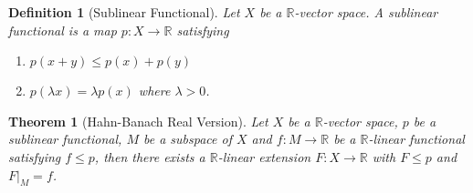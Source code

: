 \documentclass{article}
\newtheorem*{theorem}{Theorem}
\newtheorem*{definition}{Definition}
\newcommand{\R}{\mathbb{R}}
\begin{document}
\begin{definition}[Sublinear Functional]
    Let $X$ be a $\R$-vector space. A sublinear functional is a map $p : X \to \R$ satisfying
    \begin{enumerate}
        \item $p(x+y) \leq p(x) + p(y)$
        \item $p(\lambda x) = \lambda p(x)$ where $\lambda > 0$.
    \end{enumerate}  
\end{definition}

\begin{theorem}[Hahn-Banach Real Version]
    Let $X$ be a $\R$-vector space, $p$ be a sublinear functional, $M$ be a subspace of $X$ and $f : M \to \R$ be a $\R$-linear functional satisfying $f \leq p$, then there exists a $\R$-linear extension $F : X \to \R$ with $F \leq p$ and $F|_M = f$.
\end{theorem}
\end{document}

